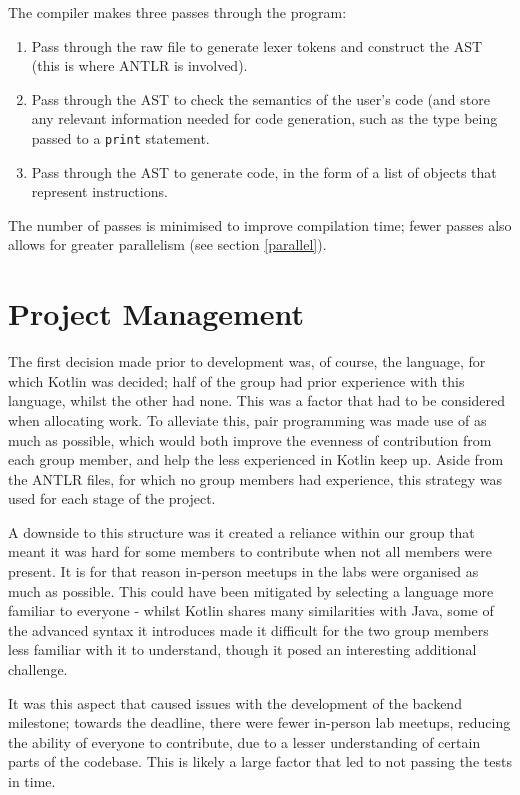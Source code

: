 \documentclass{article}
\begin{document}
The compiler makes three passes through the program:
\begin{enumerate}
    \item Pass through the raw file to generate lexer tokens and construct the AST (this is where ANTLR is involved).
    \item Pass through the AST to check the semantics of the user's code (and store any relevant information needed for code generation, such as the type being passed to a \texttt{print} statement.
    \item Pass through the AST to generate code, in the form of a list of objects that represent instructions.
\end{enumerate}
The number of passes is minimised to improve compilation time; fewer passes also allows for greater parallelism (see section \ref{parallel}).

\section{Project Management}

The first decision made prior to development was, of course, the language, for which Kotlin was decided; half of the group had prior experience with this language, whilst the other had none. This was a factor that had to be considered when allocating work. To alleviate this, pair programming was made use of as much as possible, which would both improve the evenness of contribution from each group member, and help the less experienced in Kotlin keep up. Aside from the ANTLR files, for which no group members had experience, this strategy was used for each stage of the project.

A downside to this structure was it created a reliance within our group that meant it was hard for some members to contribute when not all members were present. It is for that reason in-person meetups in the labs were organised as much as possible. This could have been mitigated by selecting a language more familiar to everyone - whilst Kotlin shares many similarities with Java, some of the advanced syntax it introduces made it difficult for the two group members less familiar with it to understand, though it posed an interesting additional challenge.

It was this aspect that caused issues with the development of the backend milestone; towards the deadline, there were fewer in-person lab meetups, reducing the ability of everyone to contribute, due to a lesser understanding of certain parts of the codebase. This is likely a large factor that led to not passing the tests in time.
\end{document}
